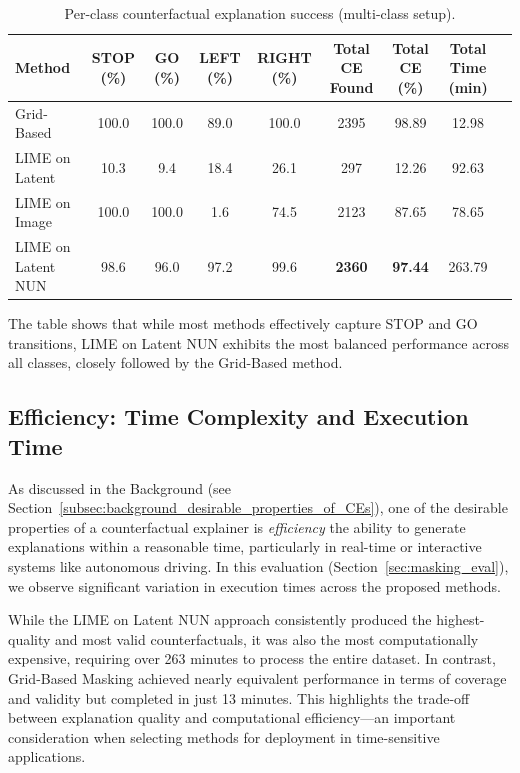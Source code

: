 \begin{table}[htbp]
\centering
\scriptsize
\begin{tabular}{lcccccccc}
\toprule
\textbf{Method} & \textbf{STOP (\%)} & \textbf{GO (\%)} & \textbf{LEFT (\%)} & \textbf{RIGHT (\%)} & \textbf{Total CE Found} & \textbf{Total CE (\%)} & \textbf{Total Time (min)} \\
\midrule
Grid-Based        & 100.0 & 100.0 & 89.0  & 100.0 & 2395 & 98.89 & 12.98 \\
LIME on Latent    & 10.3  & 9.4   & 18.4  & 26.1  & 297  & 12.26 & 92.63 \\
LIME on Image     & 100.0 & 100.0 & 1.6   & 74.5  & 2123 & 87.65 & 78.65 \\
LIME on Latent NUN & 98.6  & 96.0  & 97.2  & 99.6  & \textbf{2360} & \textbf{97.44} & 263.79 \\
\bottomrule
\end{tabular}
\caption{Per-class counterfactual explanation success (multi-class setup).}
\label{tab:classwise_ce_multi}
\end{table}

The table shows that while most methods effectively capture STOP and GO transitions, LIME on Latent NUN exhibits the most balanced performance across all classes, closely followed by the Grid-Based method.




\vspace{1em}


\subsection{Efficiency: Time Complexity and Execution Time}
As discussed in the Background (see Section~\ref{subsec:background_desirable_properties_of_CEs}), one of the desirable properties of a counterfactual explainer is \textit{efficiency} the ability to generate explanations within a reasonable time, particularly in real-time or interactive systems like autonomous driving. In this evaluation (Section~\ref{sec:masking_eval}), we observe significant variation in execution times across the proposed methods.

While the LIME on Latent NUN approach consistently produced the highest-quality and most valid counterfactuals, it was also the most computationally expensive, requiring over 263 minutes to process the entire dataset. In contrast, Grid-Based Masking achieved nearly equivalent performance in terms of coverage and validity but completed in just 13 minutes. This highlights the trade-off between explanation quality and computational efficiency—an important consideration when selecting methods for deployment in time-sensitive applications.



